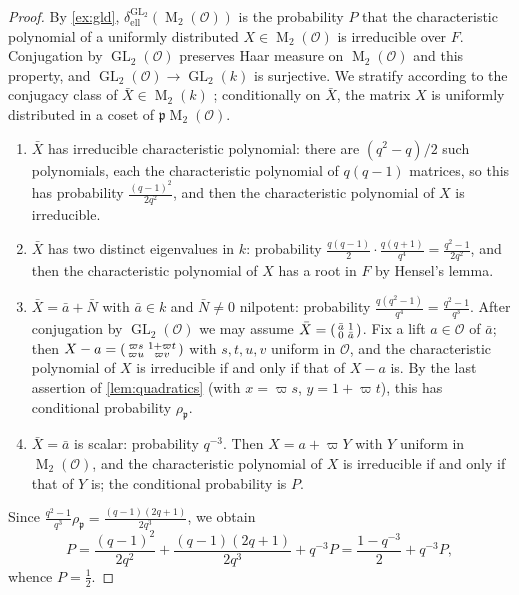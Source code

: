 \documentclass[11pt,reqno]{amsart}
\numberwithin{equation}{section}
\theoremstyle{plain}
\theoremstyle{definition}
\theoremstyle{remark}
\theoremstyle{plain}
\newcommand{\OO}{\mathcal{O}}    %
\newcommand{\pp}{\mathfrak{p}}   %
\newcommand{\elld}[2][]{\delta_{\mathrm{ell}}^{#1}(#2)}  %
\DeclareMathOperator{\GL}{GL}
\DeclareMathOperator{\Mat}{M}
\begin{document}
\begin{proof}
By \cref{ex:gld}, $\elld[\GL_2]{\Mat_2(\OO)}$ is the probability
$P$ that the characteristic polynomial of a uniformly distributed
$X\in\Mat_2(\OO)$ is irreducible over $F$. Conjugation by $\GL_2(\OO)$
preserves Haar measure on $\Mat_2(\OO)$ and this property, and
$\GL_2(\OO)\to\GL_2(k)$ is surjective. We stratify according to the
conjugacy class of $\bar X\in\Mat_2(k)$ \cite[5.3~Proposition,
6.1]{MR2234120}; conditionally on $\bar X$, the matrix $X$ is uniformly
distributed in a coset of $\pp\Mat_2(\OO)$.
\begin{enumerate}[label=\textup{(\alph*)},ref=\alph*]
\item $\bar X$ has irreducible characteristic polynomial: there are
$(q^2-q)/2$ such polynomials, each the characteristic polynomial of
$q(q-1)$ matrices, so this has probability $\frac{(q-1)^2}{2q^2}$, and
then the characteristic polynomial of $X$ is irreducible.
\item $\bar X$ has two distinct eigenvalues in $k$: probability
$\frac{q(q-1)}2\cdot\frac{q(q+1)}{q^4}=\frac{q^2-1}{2q^2}$, and then the
characteristic polynomial of $X$ has a root in $F$ by Hensel's lemma.
\item $\bar X=\bar a+\bar N$ with $\bar a\in k$ and $\bar N\ne0$
nilpotent: probability $\frac{q(q^2-1)}{q^4}=\frac{q^2-1}{q^3}$. After
conjugation by $\GL_2(\OO)$ we may assume
$\bar X=\begin{psmallmatrix}\bar a&1\\0&\bar a\end{psmallmatrix}$. Fix a
lift $a\in\OO$ of $\bar a$; then
$X-a=\begin{psmallmatrix}\varpi s&1+\varpi t\\\varpi u&\varpi v\end{psmallmatrix}$
with $s,t,u,v$ uniform in $\OO$, and the characteristic polynomial of $X$
is irreducible if and only if that of $X-a$ is. By the last assertion
of \cref{lem:quadratics} (with $x=\varpi s$, $y=1+\varpi t$), this has
conditional probability $\rho_{\pp}$.
\item $\bar X=\bar a$ is scalar: probability $q^{-3}$. Then
$X=a+\varpi Y$ with $Y$ uniform in $\Mat_2(\OO)$, and the characteristic
polynomial of $X$ is irreducible if and only if that of $Y$ is; the
conditional probability is $P$.
\end{enumerate}
Since $\frac{q^2-1}{q^3}\rho_{\pp}=\frac{(q-1)(2q+1)}{2q^3}$, we obtain
\[
P=\frac{(q-1)^2}{2q^2}+\frac{(q-1)(2q+1)}{2q^3}+q^{-3}P
=\frac{1-q^{-3}}2+q^{-3}P,
\]
whence $P=\frac12$.
\end{proof}
\end{document}
